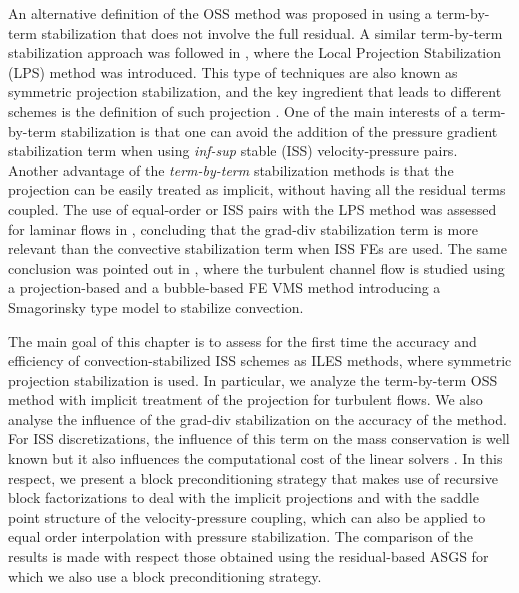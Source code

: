 An alternative definition of the OSS method was proposed in \cite{codina_analysis_2008} using a term-by-term stabilization that does not involve the full residual. A similar term-by-term stabilization approach was followed in \cite{braack_local_2006}, where the Local Projection Stabilization (LPS) method was introduced. This type of techniques are also known as symmetric projection stabilization, and the key ingredient that leads to different schemes is the definition of such projection \cite{braack_local_2006,badia_stabilized_2012}. One of the main interests of a term-by-term stabilization is that one can avoid the addition of the pressure gradient stabilization term when using \textit{inf-sup} stable (ISS) velocity-pressure pairs. Another advantage of the \textit{term-by-term} stabilization methods is that the projection can be easily treated as implicit, without having all the residual terms coupled. The use of equal-order or ISS pairs with the LPS method was assessed for laminar flows in \cite{g_lube_local_2008}, concluding that the grad-div stabilization term is more relevant than the convective stabilization term when ISS FEs are used. The same conclusion was pointed out in \cite{john_numerical_2010}, where the turbulent channel flow is studied using a projection-based and a bubble-based FE VMS method introducing a Smagorinsky type model to stabilize convection. 

The main goal of this chapter is to assess for the first time the accuracy and efficiency of convection-stabilized ISS schemes as ILES methods, where symmetric projection stabilization is used. In particular, we analyze the term-by-term OSS method with implicit treatment of the projection for turbulent flows. We also analyse the influence of the grad-div stabilization on the accuracy of the method. For ISS discretizations, the influence of this term on the mass conservation is well known \cite{linke_collision_2009} but it also influences the computational cost of the linear solvers \cite{olshanskii_grad-div_2004,heister_efficient_2013}. In this respect, we present a block preconditioning strategy that makes use of recursive block factorizations \cite{badia_block_2014} to deal with the implicit projections and with the saddle point structure of the velocity-pressure coupling, which can also be applied to equal order interpolation with pressure stabilization. The comparison of the results is made with respect those obtained using the residual-based ASGS for which we also use a block preconditioning strategy.

